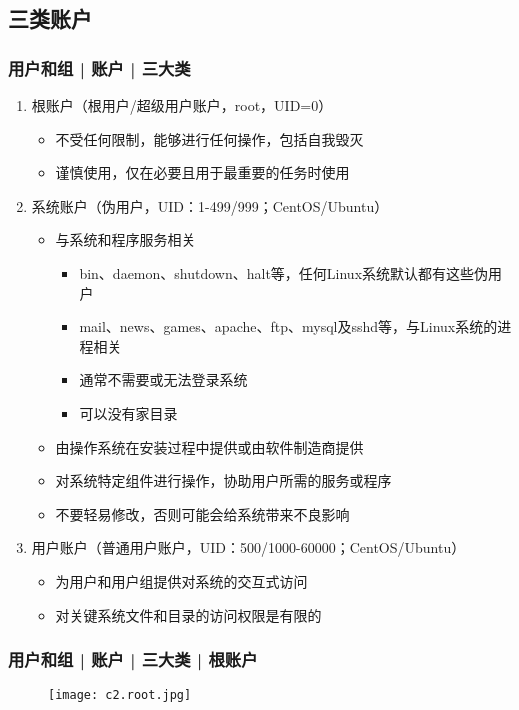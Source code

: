 \subsection{三类账户}
\begin{frame}
  \frametitle{用户和组 | 账户 | \alert{三大类}}
  \begin{enumerate}
    \item<1-> 根账户（根用户/超级用户账户，root，UID=0）
      \begin{itemize}
        \item<4-> 不受任何限制，能够进行任何操作，包括自我毁灭
        \item<5-> 谨慎使用，仅在必要且用于最重要的任务时使用
      \end{itemize}
    \item<2-> 系统账户（伪用户，UID：1-499/999；CentOS/Ubuntu）
      \begin{itemize}
        \item<6-> 与系统和程序服务相关
	  \begin{itemize}
	    \item bin、daemon、shutdown、halt等，任何Linux系统默认都有这些伪用户
	    \item mail、news、games、apache、ftp、mysql及sshd等，与Linux系统的进程相关
            \item 通常不需要或无法登录系统
            \item 可以没有家目录
	  \end{itemize}
        \item<6-> 由操作系统在安装过程中提供或由软件制造商提供
        \item<6-> 对系统特定组件进行操作，协助用户所需的服务或程序
        \item<7-> 不要轻易修改，否则可能会给系统带来不良影响
      \end{itemize}
    \item<3-> 用户账户（普通用户账户，UID：500/1000-60000；CentOS/Ubuntu）
      \begin{itemize}
        \item<8-> 为用户和用户组提供对系统的交互式访问
        \item<8-> 对关键系统文件和目录的访问权限是有限的
      \end{itemize}
  \end{enumerate}
\end{frame}

\begin{frame}
  \frametitle{用户和组 | 账户 | 三大类 | 根账户}
  \begin{figure}
    \centering
    \texttt{[image: c2.root.jpg]}
  \end{figure}
\end{frame}

